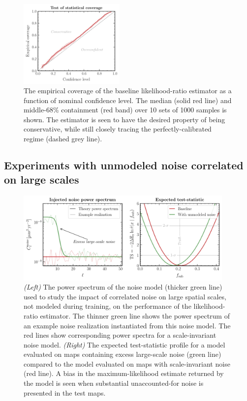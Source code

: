 \documentclass[twocolumn]{aastex631}
\begin{document}
\begin{figure}[!htbp]
\centering
\includegraphics[width=0.46\textwidth]{figures/coverage}
\caption{{The empirical coverage of the baseline likelihood-ratio estimator as a function of nominal confidence level. The median (solid red line) and middle-68\% containment (red band) over 10 sets of 1000 samples is shown. The estimator is seen to have the desired property of being conservative, while still closely tracing the perfectly-calibrated regime (dashed grey line).}}
\label{fig:coverage}
\end{figure}

\subsection{Experiments with unmodeled noise correlated on large scales}
\label{sec:lowell_noise}

\begin{figure}[!htbp]
\centering
\includegraphics[width=0.95\textwidth]{figures/lowell_noise}
\caption{\emph{(Left)} The power spectrum of the noise model (thicker green line) used to study the impact of correlated noise on large spatial scales, not modeled during training, on the performance of the likelihood-ratio estimator. The thinner green line shows the power spectrum of an example noise realization instantiated from this noise model. The red lines show corresponding power spectra for a scale-invariant noise model.  \emph{(Right)} The expected  test-statistic profile for a model evaluated on maps containing excess large-scale noise (green line) compared to the model evaluated on maps with scale-invariant noise (red line). A bias in the maximum-likelihood estimate returned by the model is seen when substantial unaccounted-for noise is presented in the test maps.}
\label{fig:noise_test}
\end{figure}
\end{document}
